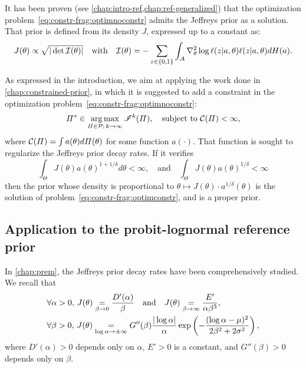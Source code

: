 It has been proven (see \cref{chap:intro-ref,chap:ref-generalized}) that the optimization problem~\eqref{eq:constr-frag:optimnoconstr} admits the Jeffreys prior as a solution. That prior is defined from its density $J$, expressed up to a constant as:
    \begin{equation}
        J(\theta)\propto\sqrt{|\det\mathcal{I}(\theta)|}\quad\text{with}\quad \mathcal{I}(\theta) = -\sum_{z\in\{0,1\}}\int_{\mathcal{A}}\nabla_\theta^2\log\ell(z|a,\theta) \ell(z|a,\theta)dH(a).
    \end{equation}

As expressed in the introduction, we aim at applying the work done in   \cref{chap:constrained-prior}, in which it is suggested to add a constraint in the optimization problem~\eqref{eq:constr-frag:optimnoconstr}:
\begin{equation}\label{eq:constr-frag:optimconstr}
    \varPi^\ast\in\operatorname*{arg\,max}_{\varPi\in\mathcal{P};\,k\rightarrow\infty}\mathscr{I}^k(\varPi),\quad\text{subject to\ }\mathcal{C}(\varPi)<\infty,
\end{equation}
where $\mathcal{C}(\varPi)= \int a(\theta)d\varPi(\theta)$ for some function $a(\cdot)$.
That function is sought to regularize the Jeffreys prior decay rates. If it verifies
    \begin{equation}\label{eq:constr-frag:inta}
        \int_\Theta J(\theta)a(\theta)^{1+1/\delta}d\theta <\infty, \quad\text{and} \quad \int_\Theta J(\theta)a(\theta)^{1/\delta}<\infty 
    \end{equation}
then the prior whose density is proportional to $\theta\mapsto J(\theta)\cdot a^{1/\delta}(\theta)$ is the solution of problem~\eqref{eq:constr-frag:optimconstr}, and is a proper prior.


\subsection{Application to the probit-lognormal reference prior}\label{sec:constr-frags:subsec-constr-in-probit}


In   \cref{chap:prem}, the Jeffreys prior decay rates have been comprehensively studied.
We recall that
    \begin{align}\label{eq:constr-frag:decaysJbeta}
        &\forall\alpha>0,\, J(\theta) \overset{}{\underset{\beta\rightarrow0}{=}}\frac{D'(\alpha)}{\beta}\quad\text{and}\quad J(\theta)\overset{}{\underset{\beta\rightarrow\infty}{=}}\frac{E'}{\alpha\beta^3}, \\
        &\forall\beta>0,\,J(\theta) \overset{}{\underset{\log\alpha\rightarrow\pm\infty}{=}}G''(\beta)\frac{|\log\alpha|}{\alpha}\exp\left(-\frac{(\log\alpha-\mu)^2}{2\beta^2+2\sigma^2}\right),\label{eq:constr-frag:decaysJalpha}
    \end{align}
where $D'(\alpha)>0$ depends only on $\alpha$, $E'>0$ is a constant, and $G''(\beta)>0$ depends only on $\beta$.

